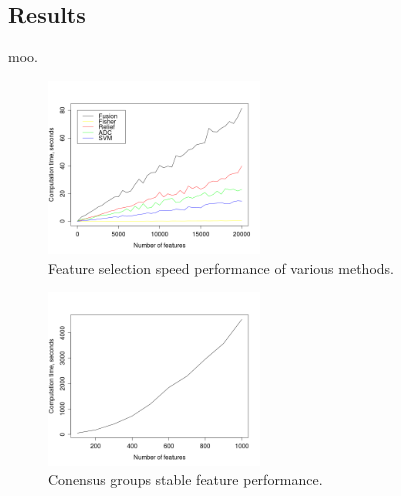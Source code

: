 \documentclass{article}
\begin{document}
\subsection{Results}

moo. 

\begin{figure}[htb]
\begin{center}
\leavevmode
\includegraphics[width=0.5\textwidth]{images/all_performance.png}
\end{center}
\caption{Feature selection speed performance of various methods.}
\label{fig:flash}
\end{figure}

\begin{figure}[htb]
\begin{center}
\leavevmode
\includegraphics[width=0.5\textwidth]{images/cgs_performance.png}
\end{center}
\caption{Conensus groups stable feature performance.}
\label{fig:flash}
\end{figure}
\end{document}

